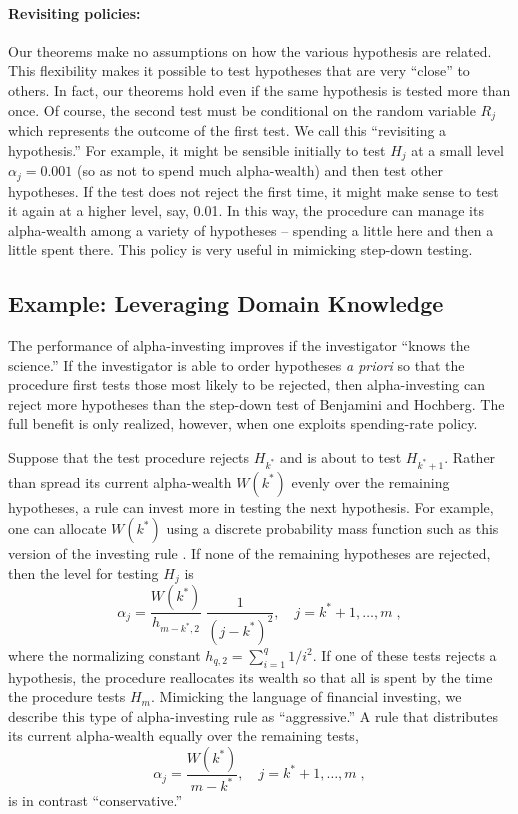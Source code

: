 \documentclass[12pt]{article}
\begin{document}
\paragraph{Revisiting policies:} Our theorems make no assumptions on how the various hypothesis are related.  This flexibility makes it possible to test  hypotheses that are very ``close'' to others.  In fact, our theorems
 hold even if the same hypothesis is tested more than once.  Of
 course, the second test must be conditional on the random variable $R_{j}$
 which represents the outcome of the first test.  We call this ``revisiting a
 hypothesis.''  For example, it might be sensible initially to test $H_{j}$
 at a small level $\alpha_{j} = 0.001$ (so as not to spend much alpha-wealth) and then test other hypotheses. If the test does not
 reject the first time, it might make sense to test it
 again at a higher level, say, 0.01.  In this way, the procedure can manage its alpha-wealth among a variety of
 hypotheses -- spending a little here and then a little spent there.  This policy
 is very useful in mimicking step-down testing.


\subsection{Example: Leveraging Domain Knowledge}

The performance of alpha-investing improves if the investigator ``knows the science.''  If the investigator is able to order hypotheses {\it a priori} so
that the procedure first tests those most likely to be rejected, then
alpha-investing can reject more hypotheses than the step-down test of Benjamini and Hochberg.  The full benefit is only realized, however, when one
exploits spending-rate policy. 

Suppose that the test procedure rejects $H_{k^{*}}$ and is about to
test $H_{k^{*}+1}$.  Rather than spread its current alpha-wealth
$W(k^{*})$ evenly over the remaining hypotheses, a rule can invest
more in testing the next hypothesis.  For example, one can allocate
$W(k^{*})$ using a discrete probability mass function such as this
version of the investing rule .  If none of the
remaining hypotheses are rejected, then the level for testing $H_j$ is
\begin{equation}
  \alpha_j
  = \frac{W(k^{*})}{h_{m-k^{*},2}} \; \frac{1}{(j-k^{*})^2}, \quad
    j = k^{*}+1,\ldots,m \;,
\label{eq:aggressive}
\end{equation}
where the normalizing constant $h_{q,2} = \sum_{i=1}^q 1/i^2$.  If one
of these tests rejects a hypothesis, the procedure reallocates its
wealth so that all is spent by the time the procedure tests $H_m$.
Mimicking the language of financial investing, we describe this type of
alpha-investing rule as ``aggressive.''  A rule that distributes its current alpha-wealth equally over the remaining tests, 
\begin{equation}
  \alpha_j
  = \frac{W(k^{*})}{m-k^{*}}, \quad  j = k^{*}+1,\ldots,m \;,
\label{eq:conservative}
\end{equation}
is in contrast ``conservative.''
\end{document}
